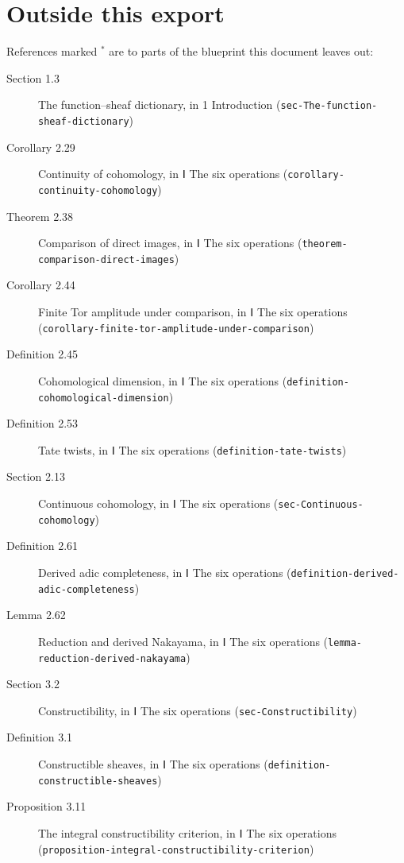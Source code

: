 \documentclass[11pt]{article}
\newcommand{\bpslug}[1]{\texttt{#1}}
\begin{document}
\section*{Outside this export}
References marked \ensuremath{{}^\ast} are to parts of the blueprint this document leaves out:
\begin{description}
\item[Section 1.3] The function–sheaf dictionary, in 1 Introduction (\bpslug{sec-{}\allowbreak{}The-{}\allowbreak{}function-{}\allowbreak{}sheaf-{}\allowbreak{}dictionary})
\item[Corollary 2.29] Continuity of cohomology, in Ⅰ The six operations (\bpslug{corollary-{}\allowbreak{}continuity-{}\allowbreak{}cohomology})
\item[Theorem 2.38] Comparison of direct images, in Ⅰ The six operations (\bpslug{theorem-{}\allowbreak{}comparison-{}\allowbreak{}direct-{}\allowbreak{}images})
\item[Corollary 2.44] Finite Tor amplitude under comparison, in Ⅰ The six operations (\bpslug{corollary-{}\allowbreak{}finite-{}\allowbreak{}tor-{}\allowbreak{}amplitude-{}\allowbreak{}under-{}\allowbreak{}comparison})
\item[Definition 2.45] Cohomological dimension, in Ⅰ The six operations (\bpslug{definition-{}\allowbreak{}cohomological-{}\allowbreak{}dimension})
\item[Definition 2.53] Tate twists, in Ⅰ The six operations (\bpslug{definition-{}\allowbreak{}tate-{}\allowbreak{}twists})
\item[Section 2.13] Continuous cohomology, in Ⅰ The six operations (\bpslug{sec-{}\allowbreak{}Continuous-{}\allowbreak{}cohomology})
\item[Definition 2.61] Derived adic completeness, in Ⅰ The six operations (\bpslug{definition-{}\allowbreak{}derived-{}\allowbreak{}adic-{}\allowbreak{}completeness})
\item[Lemma 2.62] Reduction and derived Nakayama, in Ⅰ The six operations (\bpslug{lemma-{}\allowbreak{}reduction-{}\allowbreak{}derived-{}\allowbreak{}nakayama})
\item[Section 3.2] Constructibility, in Ⅰ The six operations (\bpslug{sec-{}\allowbreak{}Constructibility})
\item[Definition 3.1] Constructible sheaves, in Ⅰ The six operations (\bpslug{definition-{}\allowbreak{}constructible-{}\allowbreak{}sheaves})
\item[Proposition 3.11] The integral constructibility criterion, in Ⅰ The six operations (\bpslug{proposition-{}\allowbreak{}integral-{}\allowbreak{}constructibility-{}\allowbreak{}criterion})

\end{description}
\end{document}
